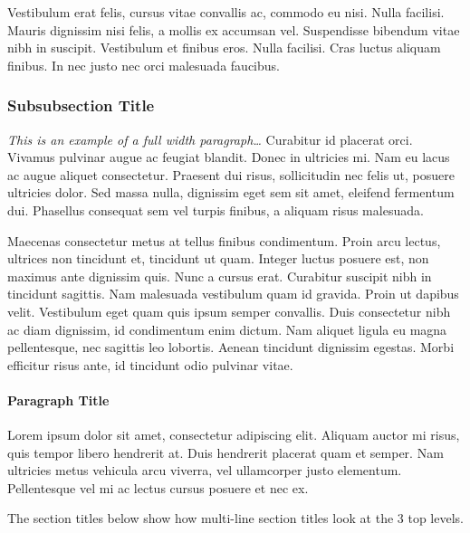 \documentclass[
	a4paper, %
	12pt, %
]{CSSullivanBusinessReport}
\begin{document}
Vestibulum erat felis, cursus vitae convallis ac, commodo eu nisi. Nulla facilisi. Mauris dignissim nisi felis, a mollis ex accumsan vel. Suspendisse bibendum vitae nibh in suscipit. Vestibulum et finibus eros. Nulla facilisi. Cras luctus aliquam finibus. In nec justo nec orci malesuada faucibus.

\subsubsection{Subsubsection Title} %

\begin{fullwidth} %
	\textit{This is an example of a full width paragraph\ldots} Curabitur id placerat orci. Vivamus pulvinar augue ac feugiat blandit. Donec in ultricies mi. Nam eu lacus ac augue aliquet consectetur. Praesent dui risus, sollicitudin nec felis ut, posuere ultricies dolor. Sed massa nulla, dignissim eget sem sit amet, eleifend fermentum dui. Phasellus consequat sem vel turpis finibus, a aliquam risus malesuada.
\end{fullwidth}

Maecenas consectetur metus at tellus finibus condimentum. Proin arcu lectus, ultrices non tincidunt et, tincidunt ut quam. Integer luctus posuere est, non maximus ante dignissim quis. Nunc a cursus erat. Curabitur suscipit nibh in tincidunt sagittis. Nam malesuada vestibulum quam id gravida. Proin ut dapibus velit. Vestibulum eget quam quis ipsum semper convallis. Duis consectetur nibh ac diam dignissim, id condimentum enim dictum. Nam aliquet ligula eu magna pellentesque, nec sagittis leo lobortis. Aenean tincidunt dignissim egestas. Morbi efficitur risus ante, id tincidunt odio pulvinar vitae.

\paragraph{Paragraph Title} %

Lorem ipsum dolor sit amet, consectetur adipiscing elit. Aliquam auctor mi risus, quis tempor libero hendrerit at. Duis hendrerit placerat quam et semper. Nam ultricies metus vehicula arcu viverra, vel ullamcorper justo elementum. Pellentesque vel mi ac lectus cursus posuere et nec ex.

The section titles below show how multi-line section titles look at the 3 top levels.
\end{document}
